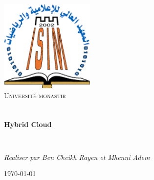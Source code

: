 \begin{titlepage}
\begin{center}

\includegraphics[width=0.35\textwidth]{./images}~\\[1cm]

\textsc{\LARGE Université  monastir}\\[1.5cm]

\textsc{\Large }\\[1cm]

\HRule \\[0.4cm]

{\huge \bfseries
Hybrid Cloud\\[0.4cm] }

\HRule \\[1cm]

\begin{minipage}{0.6\textwidth}
\begin{flushleft} \large
\emph{Realiser par Ben Cheikh Rayen et Mhenni Adem}\\

\end{flushleft}
\end{minipage}


\vfill

{\large \today}

\end{center}
\end{titlepage}